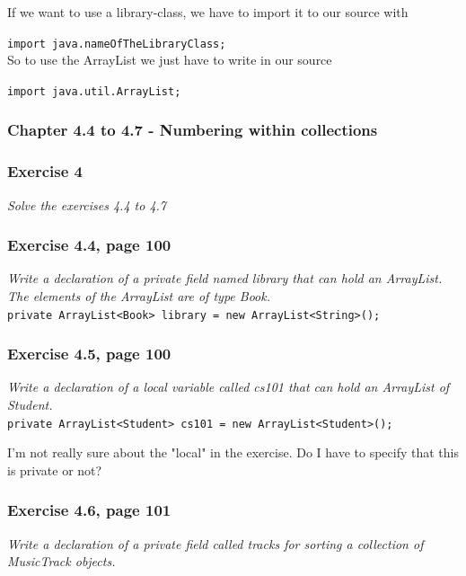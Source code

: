 \noindent
If we want to use a library-class, we have to import it to our source with

\lstinline{import java.nameOfTheLibraryClass;} \\

\noindent
So to use the ArrayList we just have to write in our source 

\lstinline{import java.util.ArrayList;} 

\subsubsection{Chapter 4.4 to 4.7 - Numbering within collections}

\subsubsection*{Exercise 4}
\textit{Solve the exercises 4.4 to 4.7}\\

\subsubsection*{Exercise 4.4, page 100}  
\textit{Write a declaration of a private field named library that can hold an
ArrayList. The elements of the ArrayList are of type Book.}\\

\lstinline{private ArrayList<Book> library = new ArrayList<String>();}

\subsubsection*{Exercise 4.5, page 100}
\textit{Write a declaration of a local variable called cs101 that can hold an
ArrayList of Student.}\\

\lstinline{private ArrayList<Student> cs101 = new ArrayList<Student>();}

I'm not really sure about the "local" in the exercise. Do I have to specify
that this is private or not?

\subsubsection*{Exercise 4.6, page 101}
\textit{Write a declaration of a private field called tracks for sorting
a collection of MusicTrack objects.}\\

